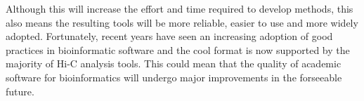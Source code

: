Although this will increase the effort and time required to develop methods, this also means the resulting tools will be more reliable, easier to use and more widely adopted. Fortunately, recent years have seen an increasing adoption of good practices in bioinformatic software and the cool format is now supported by the majority of Hi-C analysis tools. This could mean that the quality of academic software for bioinformatics will undergo major improvements in the forseeable future. 
